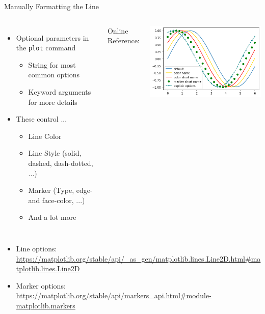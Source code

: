 \begin{frame}[fragile]{Manually Formatting the Line}
%
\vspace{-10pt}
\begin{columns}[t]
\begin{itemize}
\item Optional parameters in the \texttt{plot} command
	\begin{itemize}
	\item String for most common options
	\item Keyword arguments for more details
	\end{itemize}
\item These control ...
	\begin{itemize}
	\item Line Color
	\item Line Style (solid, dashed, dash-dotted, ...)
	\item Marker (Type, edge- and face-color, ...)
	\item And a lot more
	\end{itemize}
\end{itemize}
%
Online Reference:
%
	\begin{tcolorbox}[title=Different Line Styles]
		\includegraphics[width=\linewidth]{./gfx/plt-linestyles}
	\end{tcolorbox}
\end{columns}
%

\begin{itemize}
\item Line options: {\tiny \url{https://matplotlib.org/stable/api/_as_gen/matplotlib.lines.Line2D.html#matplotlib.lines.Line2D}}
\item Marker options: {\tiny \url{https://matplotlib.org/stable/api/markers_api.html#module-matplotlib.markers}}
\end{itemize}
%
\end{frame}

